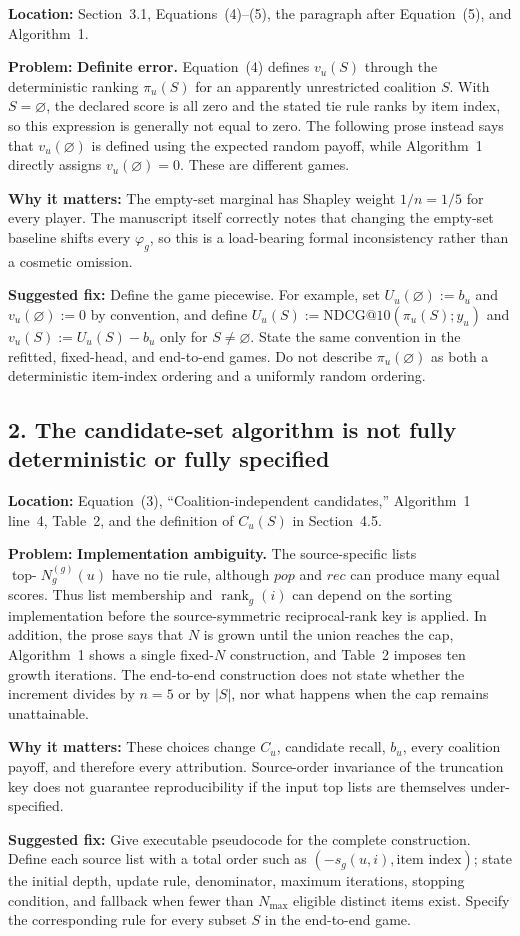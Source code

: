 \documentclass[11pt]{article}
\newcommand{\loc}[1]{\par\noindent\textbf{Location:} #1\par}
\newcommand{\problem}[1]{\noindent\textbf{Problem:} #1\par}
\newcommand{\impact}[1]{\noindent\textbf{Why it matters:} #1\par}
\newcommand{\fix}[1]{\noindent\textbf{Suggested fix:} #1\par}
\begin{document}
\loc{Section~3.1, Equations~(4)--(5), the paragraph after Equation~(5), and Algorithm~1.}
\problem{\textbf{Definite error.} Equation~(4) defines $v_u(S)$ through the deterministic ranking $\pi_u(S)$ for an apparently unrestricted coalition $S$.  With $S=\varnothing$, the declared score is all zero and the stated tie rule ranks by item index, so this expression is generally not equal to zero.  The following prose instead says that $v_u(\varnothing)$ is defined using the expected random payoff, while Algorithm~1 directly assigns $v_u(\varnothing)=0$.  These are different games.}
\impact{The empty-set marginal has Shapley weight $1/n=1/5$ for every player.  The manuscript itself correctly notes that changing the empty-set baseline shifts every $\varphi_g$, so this is a load-bearing formal inconsistency rather than a cosmetic omission.}
\fix{Define the game piecewise.  For example, set $U_u(\varnothing):=b_u$ and $v_u(\varnothing):=0$ by convention, and define $U_u(S):=\mathrm{NDCG@10}(\pi_u(S);y_u)$ and $v_u(S):=U_u(S)-b_u$ only for $S\ne\varnothing$.  State the same convention in the refitted, fixed-head, and end-to-end games.  Do not describe $\pi_u(\varnothing)$ as both a deterministic item-index ordering and a uniformly random ordering.}

\subsection*{2. The candidate-set algorithm is not fully deterministic or fully specified}

\loc{Equation~(3), ``Coalition-independent candidates,'' Algorithm~1 line~4, Table~2, and the definition of $C_u(S)$ in Section~4.5.}
\problem{\textbf{Implementation ambiguity.} The source-specific lists $\operatorname{top-}N_g^{(g)}(u)$ have no tie rule, although $pop$ and $rec$ can produce many equal scores.  Thus list membership and $\operatorname{rank}_g(i)$ can depend on the sorting implementation before the source-symmetric reciprocal-rank key is applied.  In addition, the prose says that $N$ is grown until the union reaches the cap, Algorithm~1 shows a single fixed-$N$ construction, and Table~2 imposes ten growth iterations.  The end-to-end construction does not state whether the increment divides by $n=5$ or by $|S|$, nor what happens when the cap remains unattainable.}
\impact{These choices change $C_u$, candidate recall, $b_u$, every coalition payoff, and therefore every attribution.  Source-order invariance of the truncation key does not guarantee reproducibility if the input top lists are themselves under-specified.}
\fix{Give executable pseudocode for the complete construction.  Define each source list with a total order such as $(-s_g(u,i),\text{item index})$; state the initial depth, update rule, denominator, maximum iterations, stopping condition, and fallback when fewer than $N_{\max}$ eligible distinct items exist.  Specify the corresponding rule for every subset $S$ in the end-to-end game.}
\end{document}
